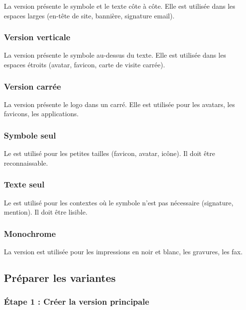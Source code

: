 La version  présente le symbole et le texte côte à côte. Elle est utilisée dans les espaces larges (en-tête de site, bannière, signature email).

\subsubsection{Version verticale}

La version  présente le symbole au-dessus du texte. Elle est utilisée dans les espaces étroits (avatar, favicon, carte de visite carrée).

\subsubsection{Version carrée}

La version  présente le logo dans un carré. Elle est utilisée pour les avatars, les favicons, les applications.

\subsubsection{Symbole seul}

Le  est utilisé pour les petites tailles (favicon, avatar, icône). Il doit être reconnaissable.

\subsubsection{Texte seul}

Le  est utilisé pour les contextes où le symbole n'est pas nécessaire (signature, mention). Il doit être lisible.

\subsubsection{Monochrome}

La version  est utilisée pour les impressions en noir et blanc, les gravures, les fax.

\subsection{Préparer les variantes}

\subsubsection{Étape 1 : Créer la version principale}

